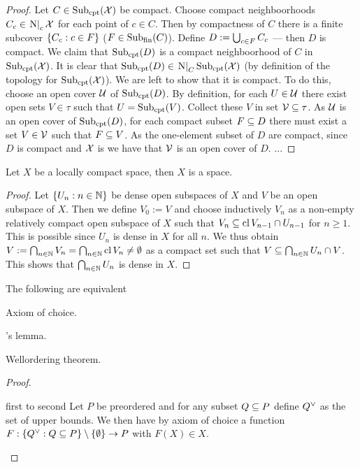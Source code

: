 \documentclass[a4paper,twoside]{article}%
\begin{document}
\begin{proof}
    Let $C\in\mathop{\mathrm{Sub}}\nolimits_{\mathop\mathrm{cpt}}(\mathcal{X})$ be compact. Choose compact neighboorhoods $C_c\in \left. \mathrm{N}\right\vert_c\mathcal{X}$ for each point of $c\in C$. Then by compactness of $C$ there is a finite subcover $\set{C_c}[c\in F]$ ($F\in\mathop{\mathrm{Sub}}\nolimits_{\mathrm{fin}}(C)$). Define $D:=\bigcup_{c\in F}{C_c}$ --- then $D$ is compact. We claim that $\mathop{\mathrm{Sub}}\nolimits_{\mathop\mathrm{cpt}}(D)$ is a compact neighboorhood of $C$ in $\mathop{\mathrm{Sub}}\nolimits_{\mathop\mathrm{cpt}}(\mathcal{X})$. It is clear that $\mathop{\mathrm{Sub}}\nolimits_{\mathop\mathrm{cpt}}(D)\in \left. \mathrm{N}\right\vert_C\mathop{\mathrm{Sub}}\nolimits_{\mathop\mathrm{cpt}}(\mathcal{X})$ (by definition of the topology for $\mathop{\mathrm{Sub}}\nolimits_{\mathop\mathrm{cpt}}(\mathcal{X})$). We are left to show that it is compact. To do this, choose an open cover $\mathcal{U}$ of $\mathop{\mathrm{Sub}}\nolimits_{\mathop\mathrm{cpt}}(D)$. By definition, for each $U\in\mathcal{U}$ there exist open sets $V\in \tau$ such that $U=\mathop{\mathrm{Sub}}\nolimits_{\mathop\mathrm{cpt}}(V)$. Collect these $V$ in set $\mathcal{V}\subseteq\tau$. As $\mathcal{U}$ is an open cover of $\mathop{\mathrm{Sub}}\nolimits_{\mathop\mathrm{cpt}}(D)$, for each compact subset $F\subseteq D$ there must exist a set $V\in \mathcal{V}$ such that $F\subseteq V$. As the one-element subset of $D$ are compact, since $D$ is compact and $\mathcal{X}$ is  we have that $\mathcal{V}$ is an open cover of $D$. ...
\end{proof}

\begin{lemma}
    Let $X$ be a locally compact space, then $X$ is a  space.
\end{lemma}

\begin{proof}
    Let $\set{U_n}[n\in\nats]$ be dense open subspaces of $X$ and $V$ be an open subspace of $X$. Then we define $V_0:=V$ and choose inductively $V_n$ as a non-empty relatively compact open subspace of $X$ such that $V_n\subseteq \mathop\mathrm{cl} V_{n-1}\cap U_{n-1}$ for $n\geq 1$. This is possible since $U_n$ is dense in $X$ for all $n$. We thus obtain $V:=\bigcap_{n\in\mathbb{N}}{V_n}=\bigcap_{n\in\mathbb{N}}{\mathop\mathrm{cl} V_n}\neq\emptyset$ as a compact set such that $V\subseteq \bigcap_{n\in\mathbb{N}}{U_n}\cap V$. This shows that $\bigcap_{n\in\mathbb{N}}{U_n}$ is dense in $X$.
\end{proof}

\begin{lemma}
    The following are equivalent
    \begin{statements}
            \item Axiom of choice.
            \item {}'s lemma.
        \item Wellordering theorem.
\end{statements}
\end{lemma}

\begin{proof}
    \begin{implications}
        \item[first to second] Let $P$ be preordered and for any subset $Q\subseteq P$ define $Q^{\vee}$ as the set of upper bounds. We then have by axiom of choice a function $F:\set{Q^{\join}}[Q\setleq P]\setminus{\set\emptyset}\to P$ with $F(X)\in X$.
    \end{implications}
\end{proof}


%
%
\end{document}
